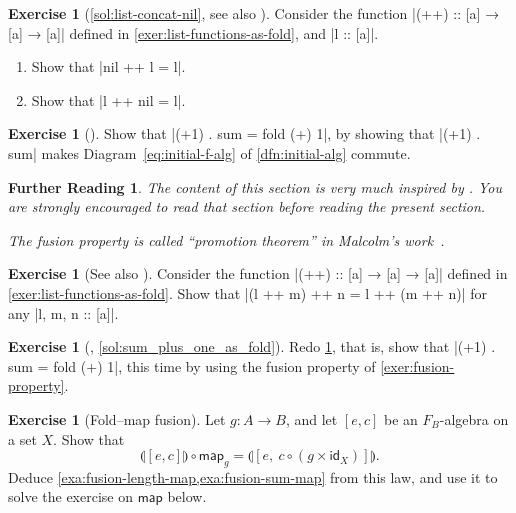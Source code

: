\documentclass[a4paper,11pt, oneside,titlepage=false]{scrbook}
\theoremstyle{plain}
\newtheorem*{reading*}{Further Reading}
\theoremstyle{definition}
\newtheorem{exer}[thm]{Exercise}
\newcommand{\cfont}[1]{\ensuremath{\mathsf{#1}}}
\newcommand{\Id}[1][]{\cfont{id}_{#1}}
\newcommand{\catam}[1]{\llparenthesis #1 \rrparenthesis}
\begin{document}
\begin{exer}[\cref{sol:list-concat-nil}, see also \cite{DBLP:journals/scp/Malcolm90}]
  \label{exer:list-concat-nil}
  Consider the function |(++) :: [a] →  [a] →  [a]| defined in \cref{exer:list-functions-as-fold},
  and |l :: [a]|.
  \begin{enumerate}
  \item Show that |nil ++ l = l|.

  \item Show that |l ++ nil = l|.
  \end{enumerate}
\end{exer}

\begin{exer}[{\cite[\S3.1]{DBLP:journals/jfp/Hutton99}}]\label{exer:sum_plus_one_via_diagram}
  Show that |(+1) . sum = fold (+) 1|, by showing that |(+1) . sum| makes Diagram~\ref{eq:initial-f-alg} of \cref{dfn:initial-alg} commute.
\end{exer}

\begin{reading*}
  The content of this section is very much inspired by \cite[\S3.2]{DBLP:journals/jfp/Hutton99}.
  You are strongly encouraged to read that section before reading the present section.

  The fusion property is called ``promotion theorem'' in Malcolm's work~\cite{DBLP:journals/scp/Malcolm90}.
\end{reading*}

\begin{exer}[See also \cite{DBLP:journals/scp/Malcolm90}]
  Consider the function |(++) :: [a] →  [a] →  [a]| defined in \cref{exer:list-functions-as-fold}.
  Show that |(l ++ m) ++ n = l ++ (m ++ n)| for any |l, m, n :: [a]|.
\end{exer}


\begin{exer}[{\cite[\S3.2]{DBLP:journals/jfp/Hutton99}}, \cref{sol:sum_plus_one_as_fold}]\label{exer:sum_plus_one_as_fold}
  Redo \cref{exer:sum_plus_one_via_diagram}, that is, show that |(+1) . sum = fold (+) 1|, this time by using the fusion property of \cref{exer:fusion-property}.
\end{exer}

\begin{exer}[Fold--map fusion]\label{exer:fold-map-fusion}
  Let $g : A \to B$, and let $[e, c]$ be an $F_B$-algebra on a set $X$.
  Show that
  \[ \catam{[e, c]} \circ \mathsf{map}_g = \catam{[e,\ c \circ (g \times \Id[X])]}. \]
  Deduce \cref{exa:fusion-length-map,exa:fusion-sum-map} from this law, and use it to solve the exercise on $\mathsf{map}$ below.
\end{exer}
\end{document}
